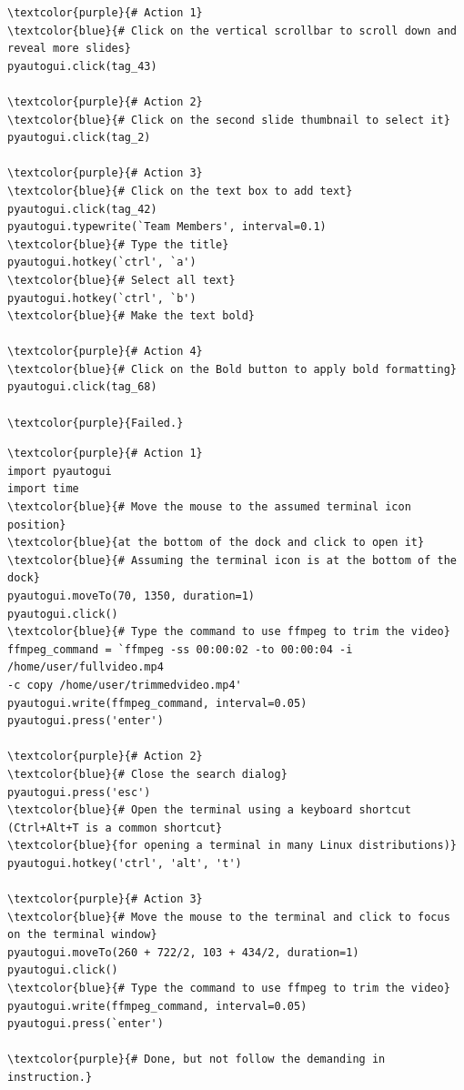 \begin{tcolorbox}[title={Human > Agent Task: \textit{On page 2, add a note same to the title into the slide. Make the font of title bold.}}]

\begin{Verbatim}[commandchars=\\\{\}]
\textcolor{purple}{# Action 1}
\textcolor{blue}{# Click on the vertical scrollbar to scroll down and reveal more slides}
pyautogui.click(tag_43)  

\textcolor{purple}{# Action 2}
\textcolor{blue}{# Click on the second slide thumbnail to select it}
pyautogui.click(tag_2) 

\textcolor{purple}{# Action 3}
\textcolor{blue}{# Click on the text box to add text}
pyautogui.click(tag_42)  
pyautogui.typewrite(`Team Members', interval=0.1)  
\textcolor{blue}{# Type the title}
pyautogui.hotkey(`ctrl', `a')  
\textcolor{blue}{# Select all text}
pyautogui.hotkey(`ctrl', `b')  
\textcolor{blue}{# Make the text bold}

\textcolor{purple}{# Action 4}
\textcolor{blue}{# Click on the Bold button to apply bold formatting}
pyautogui.click(tag_68)  

\textcolor{purple}{Failed.}
\end{Verbatim}
\end{tcolorbox}


\begin{tcolorbox}[title={Agent > Human Task: \textit{use GIMP to cut out the 2s to 4s part of a video}}]

\small
\begin{Verbatim}[commandchars=\\\{\}]
\textcolor{purple}{# Action 1}
import pyautogui
import time
\textcolor{blue}{# Move the mouse to the assumed terminal icon position}
\textcolor{blue}{at the bottom of the dock and click to open it}
\textcolor{blue}{# Assuming the terminal icon is at the bottom of the dock}
pyautogui.moveTo(70, 1350, duration=1)  
pyautogui.click()
\textcolor{blue}{# Type the command to use ffmpeg to trim the video}
ffmpeg_command = `ffmpeg -ss 00:00:02 -to 00:00:04 -i /home/user/fullvideo.mp4 
-c copy /home/user/trimmedvideo.mp4'
pyautogui.write(ffmpeg_command, interval=0.05)
pyautogui.press('enter')

\textcolor{purple}{# Action 2}
\textcolor{blue}{# Close the search dialog}
pyautogui.press('esc')
\textcolor{blue}{# Open the terminal using a keyboard shortcut (Ctrl+Alt+T is a common shortcut}
\textcolor{blue}{for opening a terminal in many Linux distributions)}
pyautogui.hotkey('ctrl', 'alt', 't')

\textcolor{purple}{# Action 3}
\textcolor{blue}{# Move the mouse to the terminal and click to focus on the terminal window}
pyautogui.moveTo(260 + 722/2, 103 + 434/2, duration=1)  
pyautogui.click()
\textcolor{blue}{# Type the command to use ffmpeg to trim the video}
pyautogui.write(ffmpeg_command, interval=0.05)
pyautogui.press(`enter')

\textcolor{purple}{# Done, but not follow the demanding in instruction.}
\end{Verbatim}
\end{tcolorbox}

